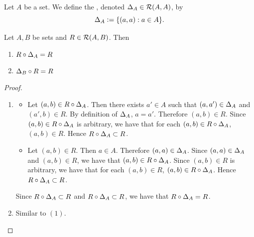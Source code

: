 \begin{defn}
	Let $A$ be a set. We define the , denoted $\Delta_A \in \mathcal{R}(A, A)$, by 
	$$\Delta_A \vcentcolon= \{(a,a): a \in A\}.$$
\end{defn}

\begin{ex}
	Let $A, B$ be sets and $R \in \mathcal{R}(A,B)$. Then 
	\begin{enumerate}
		\item $R \circ \Delta_A = R$
		\item $\Delta_B \circ R = R$
	\end{enumerate}
\end{ex}

\begin{proof}\
	\begin{enumerate}
		\item 
		\begin{itemize}
			\item Let $(a,b) \in R \circ \Delta_A$. Then there exists $a' \in A$ such that $(a, a') \in \Delta_A$ and $(a',b) \in R$. By definition of $\Delta_A$, $a = a'$. Therefore $(a,b) \in R$. Since $(a,b) \in R \circ \Delta_A$ is arbitrary, we have that for each $(a,b) \in R \circ \Delta_A$, $(a,b) \in R$. Hence $ R \circ \Delta_A \subset R$. 
			\item Let $(a,b) \in R$. Then $a \in A$. Therefore $(a,a) \in \Delta_A$. Since $(a,a) \in \Delta_A$ and $(a,b) \in R$, we have that $(a, b) \in R \circ \Delta_A$. Since $(a,b) \in R$ is arbitrary, we have that for each $(a,b) \in R$, $(a,b) \in R \circ \Delta_A$. Hence $R \circ \Delta_A \subset R$.  
		\end{itemize}
		Since $R \circ \Delta_A \subset R$ and $R \circ \Delta_A \subset R$, we have that $R \circ \Delta_A = R$.
		\item Similar to $(1)$.
	\end{enumerate}
\end{proof}

